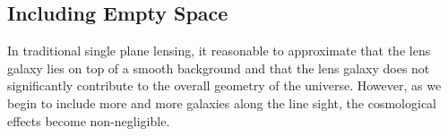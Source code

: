 \subsection{Including Empty Space}
In traditional single plane lensing, it reasonable to approximate that the lens galaxy lies on top of a smooth background and that the lens galaxy does not significantly contribute to the overall geometry of the universe. However, as we begin to include more and more galaxies along the line sight, the cosmological effects become non-negligible.
